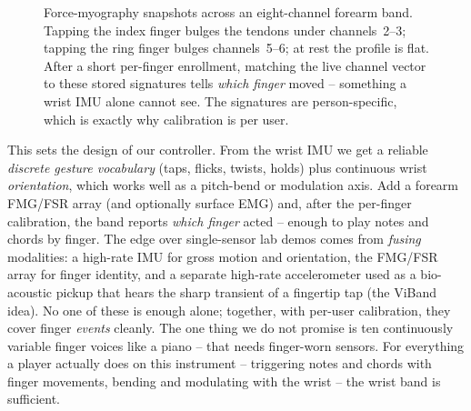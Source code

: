 \begin{figure}[H]
\centering
{}
\caption{Force-myography snapshots across an eight-channel forearm band. Tapping
the index finger bulges the tendons under channels~2--3; tapping the ring finger
bulges channels~5--6; at rest the profile is flat. After a short per-finger
enrollment, matching the live channel vector to these stored signatures tells
\emph{which finger} moved -- something a wrist IMU alone cannot see. The signatures
are person-specific, which is exactly why calibration is per user.}
\label{ch38:fig-fmg}
\end{figure}

\begin{goalbox}
This sets the design of our controller. From the wrist IMU we get a reliable
\emph{discrete gesture vocabulary} (taps, flicks, twists, holds) plus continuous
wrist \emph{orientation}, which works well as a pitch-bend or modulation axis. Add a
forearm FMG/FSR array (and optionally surface EMG) and, after the per-finger
calibration, the band reports \emph{which finger} acted -- enough to play notes and
chords by finger. The edge over single-sensor lab demos comes from \emph{fusing}
modalities: a high-rate IMU for gross motion and orientation, the FMG/FSR array for
finger identity, and a separate high-rate accelerometer used as a bio-acoustic pickup that hears the sharp transient of a fingertip tap (the ViBand idea). No one of these is enough alone; together, with per-user calibration, they
cover finger \emph{events} cleanly. The one thing we do not promise is ten
continuously variable finger voices like a piano -- that needs finger-worn sensors.
For everything a player actually does on this instrument -- triggering notes and
chords with finger movements, bending and modulating with the wrist -- the wrist
band is sufficient.
\end{goalbox}

